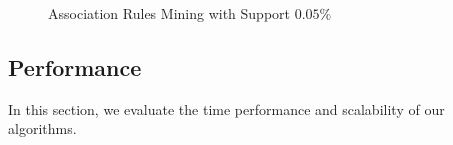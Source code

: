 \begin{figure}[th]
\centering
{}
\caption{Association Rules Mining with Support $0.05 \%$}
\label{fig:rulemining}
\end{figure}

\subsection{Performance}\label{sec:eval:performance}
In this section, we evaluate the time performance and scalability of
our algorithms.

